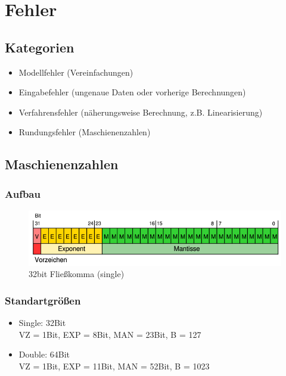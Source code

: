 \section{Fehler}

\subsection{Kategorien}
\begin{itemize}

	\item Modellfehler (Vereinfachungen)
	
	\item Eingabefehler (ungenaue Daten oder vorherige Berechnungen)
	
	\item Verfahrensfehler (näherungsweise Berechnung, z.B. Linearisierung)
	
	\item Rundungsfehler (Maschienenzahlen)

\end{itemize}

\subsection{Maschienenzahlen}

\subsubsection*{Aufbau}
\begin{figure}[h!]
	\includegraphics[width=\linewidth]{pics/floatingpoint}
	\caption{32bit Fließkomma (single)}
\end{figure}

\subsubsection*{Standartgrößen}
\begin{itemize}

	\item Single: 32Bit \\
	VZ = 1Bit, EXP = 8Bit, MAN = 23Bit, B = 127
	
	\item Double: 64Bit \\
	VZ = 1Bit, EXP = 11Bit, MAN = 52Bit, B = 1023

\end{itemize}

